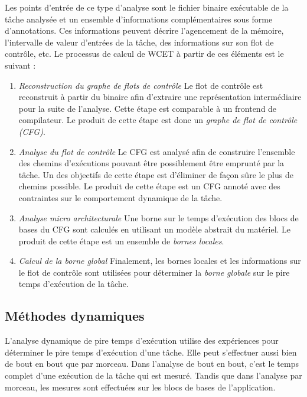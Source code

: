 Les points d'entrée de ce type d'analyse sont le fichier binaire exécutable de la tâche analysée et un ensemble d'informations complémentaires sous forme d'annotations.
Ces informations peuvent décrire l'agencement de la mémoire, l'intervalle de valeur d'entrées de la tâche, des informations sur son flot de contrôle, etc.
Le processus de calcul de WCET à partir de ces éléments est le suivant :

\begin{enumerate}
	\item \emph{Reconstruction du graphe de flots de contrôle} Le flot de contrôle est reconstruit à partir du binaire afin d'extraire une représentation intermédiaire pour la suite de l'analyse.
	Cette étape est comparable à un frontend de compilateur.
	Le produit de cette étape est donc un \emph{graphe de flot de contrôle (CFG)}.
	
	\item \emph{Analyse du flot de contrôle} Le CFG est analysé afin de construire l'ensemble des chemins d'exécutions pouvant être possiblement être emprunté par la tâche.
	Un des objectifs de cette étape est d'éliminer de façon sûre le plus de chemins possible.
	Le produit de cette étape est un CFG annoté avec des contraintes sur le comportement dynamique de la tâche.

	\item \emph{Analyse micro architecturale} Une borne sur le temps d'exécution des blocs de bases du CFG sont calculés en utilisant un modèle abstrait du matériel.
	Le produit de cette étape est un ensemble de \emph{bornes locales}.

	\item \emph{Calcul de la borne global} Finalement, les bornes locales et les informations sur le flot de contrôle sont utilisées pour déterminer la \emph{borne globale} sur le pire temps d'exécution de la tâche.
\end{enumerate}

\subsection{Méthodes dynamiques}

L'analyse dynamique de pire temps d'exécution utilise des expériences pour déterminer le pire temps d'exécution d'une tâche.
Elle peut s'effectuer aussi bien de bout en bout que par morceau.
Dans l'analyse de bout en bout, c'est le temps complet d'une exécution de la tâche qui est mesuré.
Tandis que dans l'analyse par morceau, les mesures sont effectuées sur les blocs de bases de l'application.

